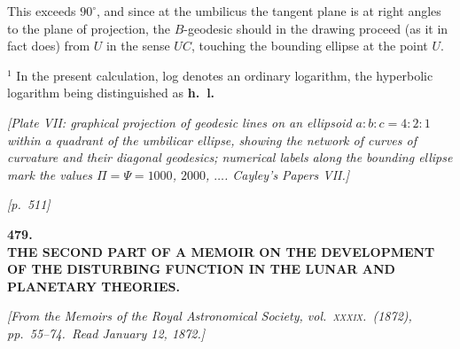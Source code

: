 \documentclass[11pt]{article}
\begin{document}
This exceeds $90^{\circ}$, and since at the umbilicus the tangent plane
is at right angles to the plane of projection, the $B$-geodesic should
in the drawing proceed (as it in fact does) from $U$ in the sense $UC$,
touching the bounding ellipse at the point $U$.

\medskip

\noindent\footnotesize $^{1}$ In the present calculation, log denotes an
ordinary logarithm, the hyperbolic logarithm being distinguished as
\textbf{h.\ l.}\normalsize

\medskip

\begin{center}
\textit{[Plate VII: graphical projection of geodesic lines on an
ellipsoid $a:b:c=4:2:1$ within a quadrant of the umbilicar ellipse,
showing the network of curves of curvature and their diagonal
geodesics; numerical labels along the bounding ellipse mark the values
$\Pi=\Psi=1000$, $2000$, $\ldots$. Cayley's Papers VII.]}
\end{center}

\newpage


\noindent\textit{[p.~511]}

\medskip

\begin{center}
\textbf{\large 479.}\\[6pt]
\textbf{\Large THE SECOND PART OF A MEMOIR ON THE DEVELOPMENT}\\[2pt]
\textbf{\Large OF THE DISTURBING FUNCTION IN THE LUNAR AND}\\[2pt]
\textbf{\Large PLANETARY THEORIES.}
\end{center}

\medskip

\noindent\textit{[From the Memoirs of the Royal Astronomical Society, vol.~\textsc{xxxix}.\
(1872), pp.~55--74.\ Read January 12, 1872.]}

\bigskip
\end{document}
